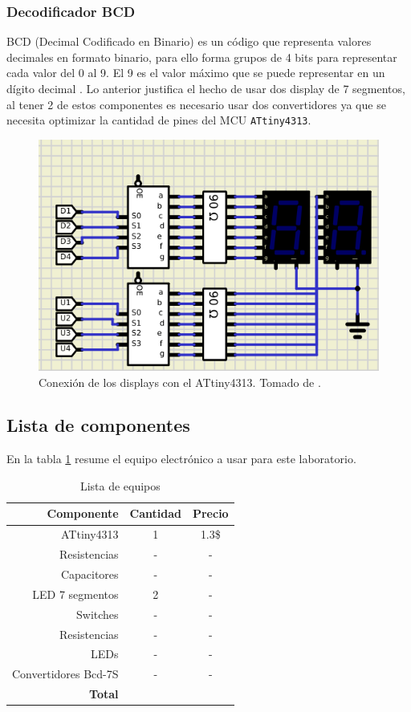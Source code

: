 \subsubsection*{Decodificador BCD}
BCD (Decimal Codificado en Binario) es un código que representa valores decimales en formato binario, para ello forma grupos de 4 bits para representar cada valor del 0 al 9. El 9 es el valor máximo que se puede representar en un dígito decimal \cite{web2}. Lo anterior justifica el hecho de usar dos display de 7 segmentos, al tener 2 de estos componentes es necesario usar dos convertidores ya que se necesita optimizar la cantidad de pines del MCU \texttt{ATtiny4313}.
    \begin{figure}[H]
        \centering
        \includegraphics[width=.5\linewidth]{Imagenes/4.png}
        \caption{Conexión de los displays con el ATtiny4313. Tomado de \cite{web}.}
        \label{fig10}
    \end{figure}

\subsection*{Lista de componentes}
En la tabla \ref{table_2} resume el equipo electrónico a usar para este laboratorio.
\begin{table}[H]
\caption{Lista de equipos}
\label{table_2}
\begin{center}
\begin{tabular}{r|cc}
\hline
\textbf{Componente}&\textbf{Cantidad}&\textbf{Precio}\\
 \hline
ATtiny4313 &1  & 1.3\$ \\  
Resistencias & - &- \\ \hline
Capacitores & - &- \\ \hline
LED 7 segmentos& 2 &- \\ \hline
Switches & - &- \\ \hline
Resistencias & - &- \\ \hline
LEDs& - &- \\ \hline
Convertidores Bcd-7S& - &- \\ \hline
 \textbf{Total}& &  \\
 \hline
\end{tabular}
\end{center}
\end{table}

